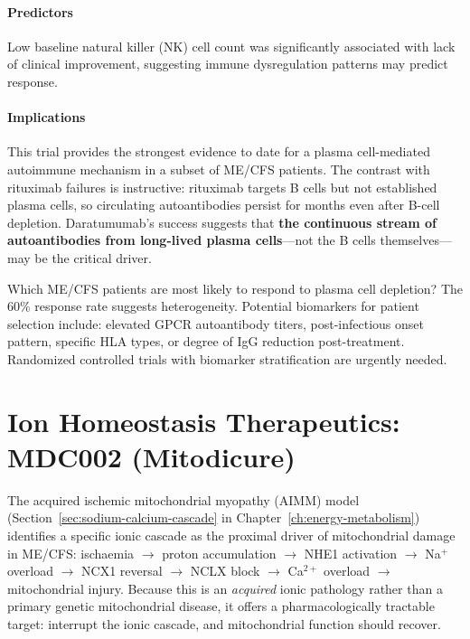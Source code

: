 \paragraph{Predictors}
Low baseline natural killer (NK) cell count was significantly associated with lack of clinical improvement, suggesting immune dysregulation patterns may predict response.

\paragraph{Implications}
This trial provides the strongest evidence to date for a plasma cell-mediated autoimmune mechanism in a subset of ME/CFS patients. The contrast with rituximab failures is instructive: rituximab targets B cells but not established plasma cells, so circulating autoantibodies persist for months even after B-cell depletion. Daratumumab's success suggests that \textbf{the continuous stream of autoantibodies from long-lived plasma cells}---not the B cells themselves---may be the critical driver.

\begin{open_question}
Which ME/CFS patients are most likely to respond to plasma cell depletion? The 60\% response rate suggests heterogeneity. Potential biomarkers for patient selection include: elevated GPCR autoantibody titers, post-infectious onset pattern, specific HLA types, or degree of IgG reduction post-treatment. Randomized controlled trials with biomarker stratification are urgently needed.
\end{open_question}

\section{Ion Homeostasis Therapeutics: MDC002 (Mitodicure)}
\label{sec:mdc002}

The acquired ischemic mitochondrial myopathy (AIMM) model (Section~\ref{sec:sodium-calcium-cascade} in Chapter~\ref{ch:energy-metabolism}) identifies a specific ionic cascade as the proximal driver of mitochondrial damage in ME/CFS: ischaemia $\to$ proton accumulation $\to$ NHE1 activation $\to$ Na$^+$ overload $\to$ NCX1 reversal $\to$ NCLX block $\to$ Ca$^{2+}$ overload $\to$ mitochondrial injury. Because this is an \emph{acquired} ionic pathology rather than a primary genetic mitochondrial disease, it offers a pharmacologically tractable target: interrupt the ionic cascade, and mitochondrial function should recover.

